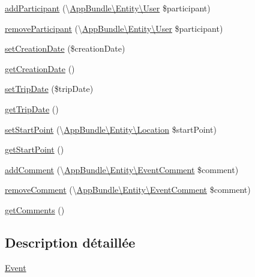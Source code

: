\begin{DoxyCompactItemize}
\hyperlink{classAppBundle_1_1Entity_1_1Event_abc3d3ec1eb7e6d40ea11690e2321bfdc}{add\+Participant} (\textbackslash{}\hyperlink{classAppBundle_1_1Entity_1_1User}{App\+Bundle\textbackslash{}\+Entity\textbackslash{}\+User} \$participant)
\item 
\hyperlink{classAppBundle_1_1Entity_1_1Event_a86efd6b253de3449f7b1c4bec18ec6f5}{remove\+Participant} (\textbackslash{}\hyperlink{classAppBundle_1_1Entity_1_1User}{App\+Bundle\textbackslash{}\+Entity\textbackslash{}\+User} \$participant)
\item 
\hyperlink{classAppBundle_1_1Entity_1_1Event_a20b1f3bfc2c142e2b807384631101d06}{set\+Creation\+Date} (\$creation\+Date)
\item 
\hyperlink{classAppBundle_1_1Entity_1_1Event_a05d1bcc8c3f23ff96a5142b24ca2ea4e}{get\+Creation\+Date} ()
\item 
\hyperlink{classAppBundle_1_1Entity_1_1Event_ac0c53f2704cbff828187476552eab6a5}{set\+Trip\+Date} (\$trip\+Date)
\item 
\hyperlink{classAppBundle_1_1Entity_1_1Event_af2da1b9ca4e516fb74fa249a81400df7}{get\+Trip\+Date} ()
\item 
\hyperlink{classAppBundle_1_1Entity_1_1Event_a2b787c614b9f5e7f8908a33cb3f1c6fc}{set\+Start\+Point} (\textbackslash{}\hyperlink{classAppBundle_1_1Entity_1_1Location}{App\+Bundle\textbackslash{}\+Entity\textbackslash{}\+Location} \$start\+Point)
\item 
\hyperlink{classAppBundle_1_1Entity_1_1Event_a530176fae73c30a523eb27824e2be5ce}{get\+Start\+Point} ()
\item 
\hyperlink{classAppBundle_1_1Entity_1_1Event_aaa67dc26030fe5c273575c5c093aeb4b}{add\+Comment} (\textbackslash{}\hyperlink{classAppBundle_1_1Entity_1_1EventComment}{App\+Bundle\textbackslash{}\+Entity\textbackslash{}\+Event\+Comment} \$comment)
\item 
\hyperlink{classAppBundle_1_1Entity_1_1Event_ae18b32a77fca5c2ec3f7e71aedb8296f}{remove\+Comment} (\textbackslash{}\hyperlink{classAppBundle_1_1Entity_1_1EventComment}{App\+Bundle\textbackslash{}\+Entity\textbackslash{}\+Event\+Comment} \$comment)
\item 
\hyperlink{classAppBundle_1_1Entity_1_1Event_a00ba9c0f8c01d2a2a7c1a2d0f66d29de}{get\+Comments} ()
\end{DoxyCompactItemize}


\subsection{Description détaillée}
\hyperlink{classAppBundle_1_1Entity_1_1Event}{Event}

